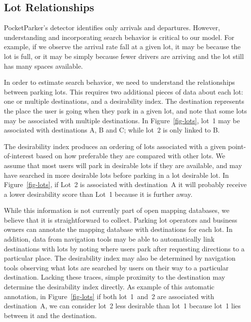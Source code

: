 \subsection{Lot Relationships}
\label{subsec-lots}

PocketParker's detector identifies only arrivals and departures. However,
understanding and incorporating search behavior is critical to our model. For
example, if we observe the arrival rate fall at a given lot, it may be
because the lot is full, or it may be simply because fewer drivers are
arriving and the lot still has many spaces available.

In order to estimate search behavior, we need to understand the relationships
between parking lots. This requires two additional pieces of data about each
lot: one or multiple destinations, and a desirability index. The destination
represents the place the user is going when they park in a given lot, and
note that some lots may be associated with multiple destinations. In
Figure~\ref{fig-lots}, lot~1 may be associated with destinations A, B and C;
while lot~2 is only linked to B.

The desirability index produces an ordering of lots associated with a given
point-of-interest based on how preferable they are compared with other lots.
We assume that most users will park in desirable lots if they are available,
and may have searched in more desirable lots before parking in a lot
desirable lot. In Figure~\ref{fig-lots}, if Lot~2 is associated with
destination~A it will probably receive a lower desirability score than Lot~1
because it is further away.

While this information is not currently part of open mapping databases, we
believe that it is straightforward to collect. Parking lot operators and
business owners can annotate the mapping database with destinations for each
lot. In addition, data from navigation tools may be able to automatically
link destinations with lots by noting where users park after requesting
directions to a particular place. The desirability index may also be
determined by navigation tools observing what lots are searched by users on
their way to a particular destination. Lacking these traces, simple proximity
to the destination may determine the desirability index directly. As example
of this automatic annotation, in Figure~\ref{fig-lots} if both lot~1~and~2 are
associated with destination~A, we can consider lot~2 less desirable than
lot~1 because lot~1 lies between it and the destination.

